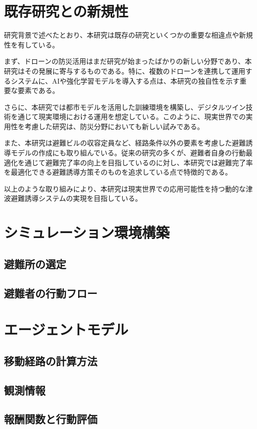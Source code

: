 \section{既存研究との新規性}  
研究背景で述べたとおり、本研究は既存の研究といくつかの重要な相違点や新規性を有している。

まず、ドローンの防災活用はまだ研究が始まったばかりの新しい分野であり、本研究はその発展に寄与するものである。特に、複数のドローンを連携して運用するシステムに、AIや強化学習モデルを導入する点は、本研究の独自性を示す重要な要素である。

さらに、本研究では都市モデルを活用した訓練環境を構築し、デジタルツイン技術を通じて現実環境における運用を想定している。このように、現実世界での実用性を考慮した研究は、防災分野においても新しい試みである。

また、本研究は避難ビルの収容定員など、経路条件以外の要素を考慮した避難誘導モデルの作成にも取り組んでいる。従来の研究の多くが、避難者自身の行動最適化を通じて避難完了率の向上を目指しているのに対し、本研究では避難完了率を最適化できる避難誘導方策そのものを追求している点で特徴的である。

以上のような取り組みにより、本研究は現実世界での応用可能性を持つ動的な津波避難誘導システムの実現を目指している。


\section{シミュレーション環境構築}
  \subsection{避難所の選定}

  \subsection{避難者の行動フロー}
\section{エージェントモデル}
  \subsection{移動経路の計算方法}
  \subsection{観測情報}
  \subsection{報酬関数と行動評価}
  
